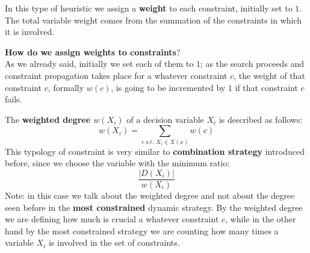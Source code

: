 In this type of heuristic we assign a \textbf{weight} to each constraint, initially set to $1$. The total variable weight comes from the summation 
of the constraints in which it is involved. \vspace{7pt}

\textbf{How do we assign weights to constraints}? \\
As we already said, initially we set each of them to $1$; as the search proceeds and constraint propagation takes place for a whatever constraint $c$, the 
weight of that constraint $c$, formally $w(c)$, is going to be incremented by $1$ if that constraint $c$ fails. \vspace{7pt}

The \textbf{weighted degree $w(X_i)$} of a decision variable $X_i$ is described as follows:
$$ w(X_i) = \sum_{c \text{ s.t. } X _i \in X(x)} w(c) $$
This typology of constraint is very similar to \textbf{combination strategy} introduced before, since we choose the variable with the minimum ratio:
$$ \frac{|D(X_i)|}{w(X_i)} $$
Note: in this case we talk about the weighted degree and not about the degree seen before in the \textbf{most constrained} dynamic strategy. By the weighted
degree we are defining how much is crucial a whatever constraint $c$, while in the other hand by the most constrained strategy we are counting how many times
a variable $X_i$ is involved in the set of constraints.